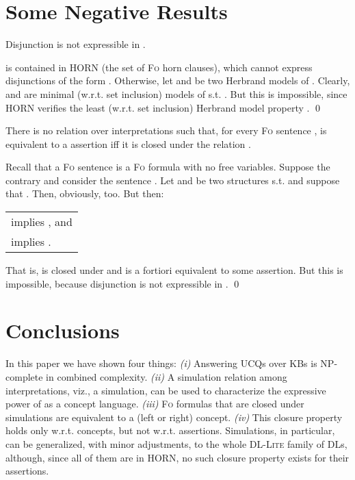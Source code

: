 \documentclass[11pt]{llncs}
\newcommand{\logic}[1]{\textsc{#1}\xspace}
\newcommand{\FOL}{\logic{Fo}}
\newcommand{\g}[1]{\logic{#1}}
\newcommand{\NP}{\textsc{NP}\xspace}
\begin{document}
\section{Some Negative Results}\label{four}


\begin{proposition}
Disjunction is not expressible in .
\end{proposition}

\proof  is contained in \g{HORN} 
(the set of \FOL horn clauses)\cite{Calvanese2007C,Calvanese2007E},
which cannot express disjunctions of the form
. 
Otherwise, let  
and 
be two Herbrand models of . Clearly,  and 
are minimal (w.r.t. set inclusion) models of  s.t. .
But this is impossible, since \g{HORN}
verifies the least (w.r.t. set inclusion) 
Herbrand model property \cite{CoriLascar}. \qed

\begin{theorem}
There is no relation  over interpretations 
such that,
for every \FOL sentence ,  is equivalent to a
 assertion iff it is closed under 
the relation .
\end{theorem}

\proof Recall that a \FOL sentence is a 
\FOL formula with no free variables.
Suppose the contrary and consider the sentence
. Let  and  be two 
structures s.t.  and suppose that
. Then, obviously,  too.
But then:
\begin{center}
\begin{tabular}{l}
 implies , and\\
 implies .
\end{tabular}
\end{center}
That is,   is closed under  and is a fortiori
equivalent to some
 assertion.
But this is impossible, because disjunction is not expressible
in . \qed

\section{Conclusions}\label{five}


In this paper we have shown four things:
\textit{(i)} Answering UCQs over  KBs is \NP-complete in
combined complexity.
\textit{(ii)} A simulation relation among interpretations, viz., a  simulation, 
can be used to characterize the expressive power of  as a
concept language.
\textit{(iii)} \FOL formulas that are closed under  simulations
are equivalent to a (left or right)  concept.
\textit{(iv)} This closure property holds only w.r.t. concepts, but not w.r.t.
assertions. 
Simulations, in particular, can be generalized, with minor adjustments, to
the whole \g{DL-Lite} family of DLs, although, since all of them are in
\g{HORN}, no such closure property exists for their assertions.



\end{document}
